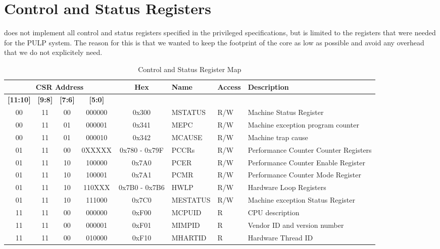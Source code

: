 \chapter{Control and Status Registers}
\label{chap:csr}

\rvcore does not implement all control and status registers specified in the
\riscv privileged specifications, but is limited to the registers that were
needed for the PULP system.
The reason for this is that we wanted to keep the footprint of the core as low
as possible and avoid any overhead that we do not explicitely need.

\begin{landscape}
\begin{table}[H]
 \caption{Control and Status Register Map}
 \label{tab:csr_map}
 \centering\begin{tabularx}{\linewidth}{@{}|cccc|c|l|l|X|@{}} \toprule
   \multicolumn{4}{|c|}{\textbf{CSR Address}} & \textbf{Hex} & \textbf{Name} & \textbf{Access}  & \textbf{Description} \\ \hline
   \textbf{[11:10]} & \textbf{[9:8]} & \textbf{[7:6]} & \textbf{[5:0]} & & & & \\ \toprule
   00 & 11 & 00 & 000000  & 0x300         & MSTATUS  & R/W & Machine Status Register \\ \hline
   00 & 11 & 01 & 000001  & 0x341         & MEPC     & R/W & Machine exception program counter \\ \hline
   00 & 11 & 01 & 000010  & 0x342         & MCAUSE   & R/W & Machine trap cause \\ \hline
   01 & 11 & 00 & 0XXXXX  & 0x780 - 0x79F & PCCRs    & R/W & Performance Counter Counter Registers \\ \hline
   01 & 11 & 10 & 100000  & 0x7A0         & PCER     & R/W & Performance Counter Enable Register \\ \hline
   01 & 11 & 10 & 100001  & 0x7A1         & PCMR     & R/W & Performance Counter Mode Register \\ \hline
   01 & 11 & 10 & 110XXX  & 0x7B0 - 0x7B6 & HWLP     & R/W & Hardware Loop Registers \\ \hline
   01 & 11 & 10 & 111000  & 0x7C0         & MESTATUS & R/W & Machine exception Status Register \\ \hline
   11 & 11 & 00 & 000000  & 0xF00         & MCPUID   & R   & CPU description  \\ \hline
   11 & 11 & 00 & 000001  & 0xF01         & MIMPID   & R   & Vendor ID and version number \\ \hline
   11 & 11 & 00 & 010000  & 0xF10         & MHARTID  & R   & Hardware Thread ID \\ \bottomrule
  \end{tabularx}
\end{table}
\end{landscape}

